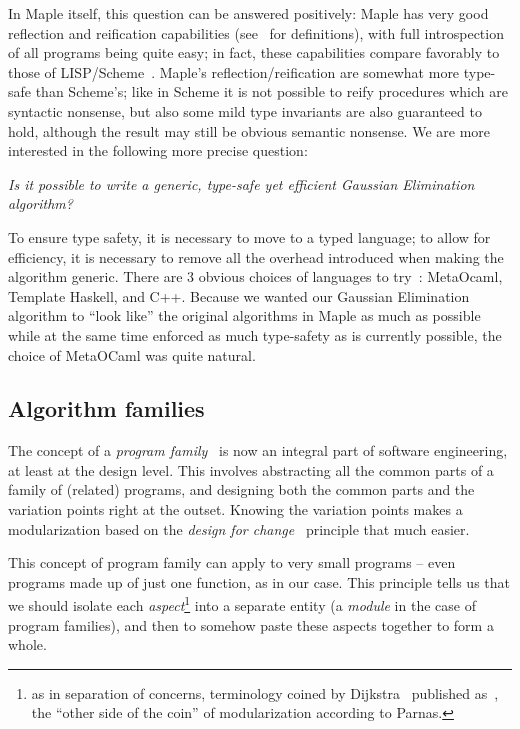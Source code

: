 \documentclass[11pt]{elsart}
\begin{document}
\noindent In Maple itself, this question can be answered positively:
Maple has very good reflection and reification capabilities
(see~\cite{JoGoSe93} for definitions), with
full introspection of all programs being quite easy; in fact, these
capabilities compare favorably to those of LISP/Scheme~\cite{Abelson:1998:RRA}.
Maple's reflection/reification are somewhat more type-safe than 
Scheme's; like in Scheme it is not possible to reify procedures 
which are syntactic nonsense, but also some mild type invariants are
also guaranteed to hold, although the result may still be obvious
semantic nonsense.  We are more interested in the following more precise
question:

\begin{center}
\emph{Is it possible to write a generic, type-safe yet efficient 
Gaussian Elimination algorithm?}
\end{center}

To ensure type safety, it is necessary to move to a typed language; to
allow for efficiency, it is necessary to remove all the overhead
introduced when making the algorithm generic.  There are 3 obvious choices
of languages to try~\cite{conf/dagstuhl/CzarneckiOST03}: MetaOcaml, 
Template Haskell, and
C++.  Because we wanted our Gaussian Elimination algorithm to ``look like''
the original algorithms in Maple as much as possible while at the same time
enforced as much type-safety as is currently possible, the choice of 
MetaOCaml was quite natural.

\subsection{Algorithm families}

The concept of a \emph{program family}~\cite{journals/tse/Parnas76} is
now an integral
part of software engineering, at least at the design level.  This involves
abstracting all the common parts of a family of (related) programs, and
designing both the common parts and the variation points right at the 
outset.  Knowing the variation points makes a modularization based on
the \emph{design for change}~\cite{journals/cacm/Parnas72a} principle 
that much easier.

This concept of program family can apply to very small programs -- even
programs made up of just one function, as in our case.  This principle
tells us that we should isolate each \emph{aspect}\footnote{as in
separation of concerns, terminology coined by 
Dijkstra~\cite{EWD:EWD447} published as~\cite{EWD:EWD447pub},
the ``other side of the coin'' of modularization according to Parnas.} 
into a separate entity
(a \emph{module} in the case of program families), and then to somehow
paste these aspects together to form a whole.
\end{document}
